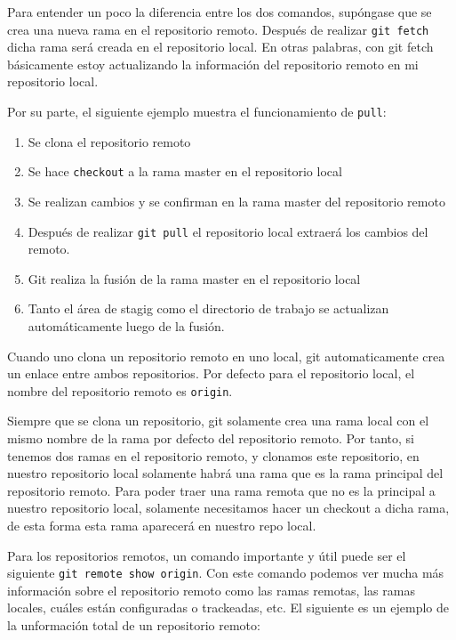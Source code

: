 Para entender un poco la diferencia entre los dos comandos, supóngase que se crea una nueva rama en el repositorio remoto. Después de realizar \texttt{git fetch} dicha rama será creada en el repositorio local. En otras palabras, con git fetch básicamente estoy actualizando la información del repositorio remoto en mi repositorio local.

Por su parte, el siguiente ejemplo muestra el funcionamiento de \texttt{pull}:

\begin{enumerate}
    \item Se clona el repositorio remoto
    \item Se hace \texttt{checkout} a la rama master en el repositorio local
    \item Se realizan cambios y se confirman en la rama master del repositorio remoto
    \item Después de realizar \texttt{git pull} el repositorio local extraerá los cambios del remoto.
    \item Git realiza la fusión de la rama master en el repositorio local 
    \item Tanto el área de stagig como el directorio de trabajo se actualizan automáticamente luego de la fusión.
\end{enumerate}

Cuando uno clona un repositorio remoto en uno local, git automaticamente crea un enlace entre ambos repositorios. Por defecto para el repositorio local, el nombre del repositorio remoto es \texttt{origin}. 

Siempre que se clona un repositorio, git solamente crea una rama local con el mismo nombre de la rama por defecto del repositorio remoto. Por tanto, si tenemos dos ramas en el repositorio remoto, y clonamos este repositorio, en nuestro repositorio local solamente habrá una rama que es la rama principal del repositorio remoto. Para poder traer una rama remota que no es la principal a nuestro repositorio local, solamente necesitamos hacer un checkout a dicha rama, de esta forma esta rama aparecerá en nuestro repo local.

Para los repositorios remotos, un comando importante y útil puede ser el siguiente \texttt{git remote show origin}. Con este comando podemos ver mucha más información sobre el repositorio remoto como las ramas remotas, las ramas locales, cuáles están configuradas o trackeadas, etc. El siguiente es un ejemplo de la unformación total de un repositorio remoto:

